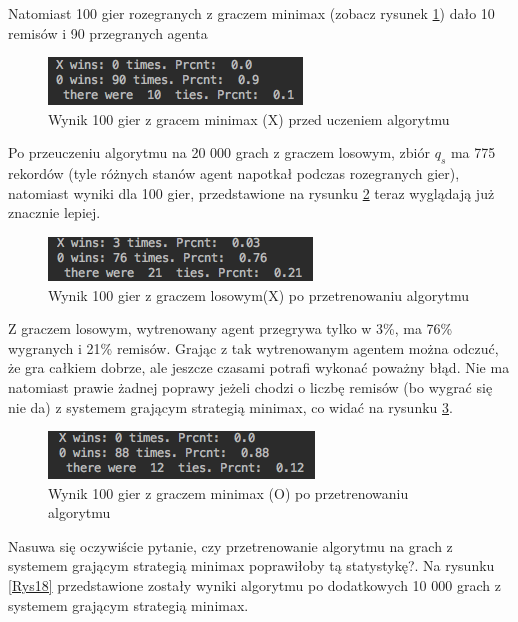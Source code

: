 \documentclass[licencjacka]{pracamgr}
\begin{document}
Natomiast 100 gier rozegranych z graczem minimax (zobacz rysunek \ref{Rys15}) dało 10 remisów i 90 przegranych agenta\\
\begin{figure}[h!]
	\includegraphics [scale=0.7]{QTable_vs_Minimax_untrained.png}
	\caption{Wynik 100 gier z gracem minimax (X) przed uczeniem algorytmu}
	\label{Rys15}
\end{figure}

Po przeuczeniu algorytmu na 20 000 grach z graczem losowym, zbiór $q_{s}$ ma 775 rekordów (tyle różnych stanów  agent napotkał podczas rozegranych gier), natomiast wyniki dla 100 gier, przedstawione na rysunku \ref{Rys16} teraz wyglądają już znacznie lepiej.\\

\begin{figure}[h!]
	\includegraphics [scale=0.7]{Qtable_vs_Rnd_trained.png}
	\caption{Wynik 100 gier z graczem losowym(X) po przetrenowaniu algorytmu}
	\label{Rys16}
\end{figure}


Z graczem losowym, wytrenowany agent przegrywa tylko w 3\%, ma 76\% wygranych i 21\% remisów. Grając z tak wytrenowanym agentem można odczuć, że gra całkiem dobrze, ale jeszcze czasami potrafi wykonać poważny błąd. Nie ma natomiast prawie żadnej poprawy jeżeli chodzi o liczbę remisów (bo wygrać się nie da) z systemem grającym strategią minimax, co widać na rysunku \ref{Rys17}. \\

\begin{figure}[h!]
	\includegraphics [scale=0.7]{QTable_vs_Minimax_trained.png}
	\caption{Wynik 100 gier z graczem minimax (O) po przetrenowaniu algorytmu}
	\label{Rys17}
\end{figure}

Nasuwa się oczywiście pytanie, czy przetrenowanie algorytmu na grach z systemem grającym strategią minimax poprawiłoby tą statystykę?. Na rysunku \ref{Rys18} przedstawione zostały wyniki algorytmu po dodatkowych 10 000 grach z systemem grającym strategią minimax.\\
\end{document}
